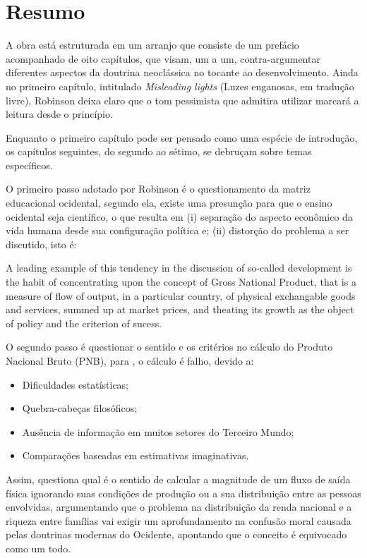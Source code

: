 	\chapter{Resumo}
	
	A obra está estruturada em um arranjo que consiste de um prefácio acompanhado de oito capítulos, que visam, um a um, contra-argumentar diferentes aspectos da doutrina neoclássica no tocante ao desenvolvimento. Ainda no primeiro capítulo, intitulado \textit{Misleading lights} (Luzes enganosas, em tradução livre), Robinson deixa claro que o tom pessimista que admitira utilizar marcará a leitura desde o princípio.
	
	Enquanto o primeiro capítulo pode ser pensado como uma espécie de introdução, os capítulos seguintes, do segundo ao sétimo, se debruçam sobre temas específicos.
	
	O primeiro passo adotado por Robinson é o questionamento da matriz educacional ocidental, segundo ela, existe uma presunção para que o ensino ocidental seja científico, o que resulta em (i) separação do aspecto econômico da vida humana desde sua configuração política e; (ii) distorção do problema a ser discutido, isto é:
	
	\begin{citacao}
		A leading example of this tendency in the discussion of so-called development is the habit of concentrating upon the concept of Gross National Product, that is a measure of flow of output, in a particular country, of physical exchangable goods and services, summed up at market prices, and theating its growth as the object of policy and the criterion of sucess.
		\cite[pág. 3]{Robinson1979}
	\end{citacao}
	
	O segundo passo é questionar o sentido e os critérios no cálculo do Produto Nacional Bruto (PNB), para , o cálculo é falho, devido a:
	\begin{itemize}
		\item Dificuldades estatísticas;
		\item Quebra-cabeças filosóficos;
		\item Ausência de informação em muitos setores do Terceiro Mundo;
		\item Comparações baseadas em estimativas imaginativas.
	\end{itemize}
	
	Assim,  questiona qual é o sentido de calcular a magnitude de um fluxo de saída física ignorando suas condições de produção ou a sua distribuição entre as pessoas envolvidas, argumentando que o problema na distribuição da renda nacional e a riqueza entre famílias vai exigir um aprofundamento na confusão moral causada pelas doutrinas modernas do Ocidente, apontando que o conceito é equivocado como um todo.
	
